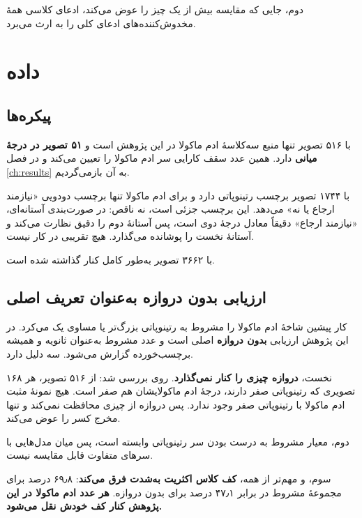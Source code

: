 دوم، جایی که مقایسه بیش از یک چیز را عوض می‌کند، ادعای کلاسی همهٔ مخدوش‌کننده‌های ادعای کلی را
به ارث می‌برد.

\section{داده}

\subsection{پیکره‌ها}

 \cite{porwal2018idrid} با \num{۵۱۶} تصویر تنها منبع سه‌کلاسهٔ ادم ماکولا در این پژوهش است و
\textbf{\num{۵۱} تصویر در درجهٔ میانی} دارد. همین عدد سقف کارایی سر ادم ماکولا را تعیین می‌کند و در
فصل \ref{ch:results} به آن بازمی‌گردیم.

 \cite{decenciere2014messidor} با \num{۱۷۴۴} تصویر برچسب رتینوپاتی دارد و برای ادم ماکولا تنها برچسب دودویی
«نیازمند ارجاع یا نه» می‌دهد. این برچسب جزئی است، نه ناقص: در صورت‌بندی آستانه‌ای، «نیازمند
ارجاع» دقیقاً معادل درجهٔ دوی  است، پس آستانهٔ دوم را دقیق نظارت می‌کند و آستانهٔ
نخست را پوشانده می‌گذارد. هیچ تقریبی در کار نیست.

 \cite{aptos2019} با \num{۳۶۶۲} تصویر به‌طور کامل کنار گذاشته شده است.

\subsection{ارزیابی بدون دروازه به‌عنوان تعریف اصلی}
\label{sec:gating}

کار پیشین شاخهٔ ادم ماکولا را مشروط به رتینوپاتی بزرگ‌تر یا مساوی یک می‌کرد. در این پژوهش
ارزیابی \textbf{بدون دروازه} اصلی است و عدد مشروط به‌عنوان ثانویه و همیشه برچسب‌خورده گزارش
می‌شود. سه دلیل دارد.

نخست، \textbf{دروازه چیزی را کنار نمی‌گذارد}. روی  بررسی شد: از \num{۵۱۶} تصویر، هر \num{۱۶۸}
تصویری که رتینوپاتی صفر دارند، درجهٔ ادم ماکولایشان هم صفر است. هیچ نمونهٔ مثبت ادم ماکولا با
رتینوپاتی صفر وجود ندارد. پس دروازه از چیزی محافظت نمی‌کند و تنها مخرج کسر را عوض می‌کند.

دوم، معیار مشروط به درست بودن سر رتینوپاتی وابسته است، پس میان مدل‌هایی با سرهای متفاوت
قابل مقایسه نیست.

سوم، و مهم‌تر از همه، \textbf{کف کلاس اکثریت به‌شدت فرق می‌کند}: \num{۶۹٫۸} درصد برای مجموعهٔ مشروط
در برابر \num{۴۷٫۱} درصد برای بدون دروازه. \textbf{هر عدد ادم ماکولا در این پژوهش کنار کف خودش نقل
می‌شود.}

